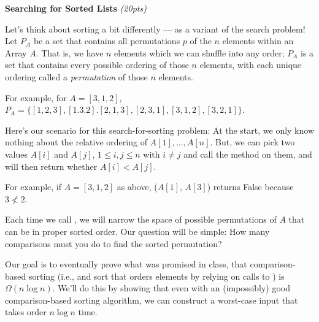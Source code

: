 \documentclass{exam}
\begin{document}
\begin{questions}

    \question \textbf{Searching for Sorted Lists} \textit{(20pts)}
    
    Let's think about sorting a bit differently --- as a variant of the search problem! Let $P_A$ be a set that contains all permutations $p$ of the $n$ elements within an Array $A$. That is, we have $n$ elements which we can shuffle into any order; $P_A$ is a set that contains every possible ordering of those $n$ elements, with each unique ordering called a \textit{permutation} of those $n$ elements. 

    For example, for $A = [3, 1, 2]$, $P_A = \{[1, 2, 3], [1. 3. 2]. [2, 1, 3], [2, 3, 1], [3, 1, 2], [3, 2 ,1]\}$. 

    Here's our scenario for this search-for-sorting problem: At the start, we only know nothing about the relative ordering of $A[1], \dots, A[n]$. But, we can pick two values $A[i]$ and $A[j]$, $1 \leq i, j \leq n$ with $i \neq j$ and call the method  on them, and  will then return whether $A[i] < A[j]$. 

    For example, if $A = [3, 1, 2]$ as above, ($A[1]$, $A[3]$) returns False because $3 \nless 2$.

    Each time we call , we will narrow the space of possible permutations of $A$ that can be in proper sorted order. Our question will be simple: How many comparisons must you do to find the sorted permutation?

    Our goal is to eventually prove what was promised in class, that comparison-based sorting (i.e., and sort that orders elements by relying on calls to ) is $\Omega(n\log n)$. We'll do this by showing that even with an (impossibly) good comparison-based sorting algorithm, we can construct a worst-case input that takes order $n\log n$ time. 
    

\end{questions}
\end{document}
